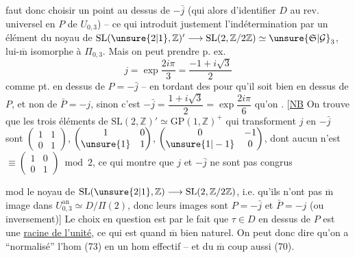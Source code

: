 faut donc choisir un point  au dessus
de $-\bar j$ (qui  alors d'identifier
$D$ au rev. universel  en $P$ de
$U_{0,3}$) -- ce qui introduit justement
l'indétermination par un élément du
noyau de $\mathrm{SL}(\unsure{2|1},\mathbb Z)'\longrightarrow
\mathrm{SL}(2,\mathbb Z/2\mathbb Z)\simeq\unsure{\mathfrak S|\mathcal G}_3$,
lui-$\overline{\mathrm m}$ isomorphe à $\Pi_{0,3}$. Mais
on peut prendre p. ex.
\[
\tag{77}
j=\exp\frac{2i\pi}{3}=\frac{-1+i\sqrt{3}}{2}
\]
comme  pt. en dessus de
$P=-\bar j$ -- en tordant des  pour
qu'il soit bien en dessus de $P$, et non
de $\bar P=-j$, sinon c'est $-\bar j=\dfrac{1+i\sqrt{3}}{2}=\exp\dfrac{2i\pi}{6}$
qu'on . [\uline{NB} On trouve que
les trois éléments de $\mathrm{SL}(2,\mathbb Z)'\simeq\mathrm{GP}(1,\mathbb Z)^+$
qui transforment $j$ en $-\bar j$ sont
$\begin{pmatrix}1&1\\0&1\end{pmatrix}$,
$\begin{pmatrix}1&0\\\unsure{1}&1\end{pmatrix}$,
$\begin{pmatrix}0&-1\\\unsure{1|-1}&0\end{pmatrix}$, dont aucun
n'est $\equiv\begin{pmatrix}1&0\\0&1\end{pmatrix}\bmod 2$, ce qui montre que
$j$ et $-\bar j$  ne sont pas congrus

mod le noyau  de
$\mathrm{SL}(\unsure{2|1},\mathbb Z)\longrightarrow\mathrm{SL}(2,\mathbb Z/2\mathbb Z)$,
i.e. qu'ils n'ont pas $\overline{\mathrm m}$ image dans $U_{0,3}^{\mathrm{an}}
\simeq D/\Pi(2)$, donc leurs images sont
$P=-\bar j$ et $\bar P=-j$ (ou inversement)] Le
choix en question est  
par le fait que $\tau\in D$ en dessus de
$P$ est  une \uline{racine de l'unité}, ce qui
est quand $\overline{\mathrm m}$ bien naturel. On peut
donc dire qu'on a ``normalisé'' l'hom
 (73) en un hom effectif -- et du
$\overline{\mathrm m}$ coup aussi (70).


